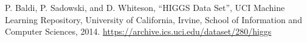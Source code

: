 \documentclass[notoc]{porocilo}
\begin{document}
\begin{thebibliography}{9}
    P. Baldi, P. Sadowski, and D. Whiteson,
    ``HIGGS Data Set'',
    UCI Machine Learning Repository,
    University of California, Irvine, School of Information and Computer Sciences,
    2014.
    \url{https://archive.ics.uci.edu/dataset/280/higgs}
\end{thebibliography}
\end{document}
